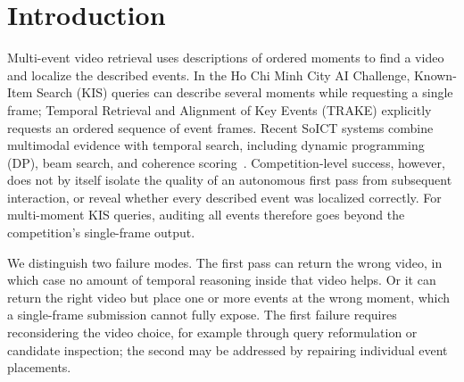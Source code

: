 \section{Introduction}
\label{sec:introduction}

Multi-event video retrieval uses descriptions of ordered moments to find a video and localize the described events.
In the Ho Chi Minh City AI Challenge, Known-Item Search (KIS) queries can describe several moments while requesting a single frame; Temporal Retrieval and Alignment of Key Events (TRAKE) explicitly requests an ordered sequence of event frames.
Recent SoICT systems combine multimodal evidence with temporal search, including dynamic programming (DP), beam search, and coherence scoring~\cite{luu2025dante,do2025tars,vu2025madtempo,nguyen2025cscs,dinh2025kpter,nguyen2025agentdp,ho2025lucifertrace,nguyen2025eventsspeak}.
Competition-level success, however, does not by itself isolate the quality of an autonomous first pass from subsequent interaction, or reveal whether every described event was localized correctly.
For multi-moment KIS queries, auditing all events therefore goes beyond the competition's single-frame output.

We distinguish two failure modes.
The first pass can return the wrong video, in which case no amount of temporal reasoning inside that video helps.
Or it can return the right video but place one or more events at the wrong moment, which a single-frame submission cannot fully expose.
The first failure requires reconsidering the video choice, for example through query reformulation or candidate inspection; the second may be addressed by repairing individual event placements.

